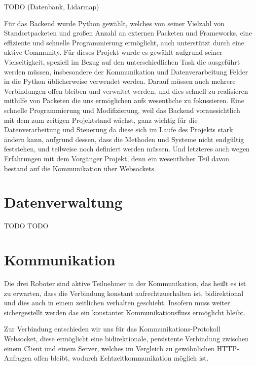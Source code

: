 TODO (Datenbank, Lidarmap)


Für das Backend wurde Python gewählt, 
welches von seiner Vielzahl von Standortpacketen und 
großen Anzahl an externen Packeten und Frameworks, 
eine effiziente und schnelle Programmierung ermöglicht, 
auch unterstützt durch eine aktive Community.
% 
Für dieses Projekt wurde es gewählt aufgrund seiner Vielseitigkeit, 
speziell im Bezug auf den unterschiedlichen Task die ausgeführt werden müssen, 
insbesondere der Kommunikation und Datenverarbeitung 
Felder in die Python üblicherweise verwendet werden.
% 
Darauf müssen auch mehrere Verbindungen offen bleiben und verwaltet werden,
und dies schnell zu realisieren mithilfe von Packeten 
die uns ermöglichen aufs wesentliche zu fokussieren.
% 
Eine schnelle Programmierung und Modifizierung, 
weil das Backend voraussichtlich mit dem zum zeitigen Projektstand wächst, 
ganz wichtig für die Datenverarbeitung und Steuerung da diese sich im Laufe des Projekts stark ändern kann,
aufgrund dessen, dass die Methoden und Systeme nicht endgültig feststehen, 
und teilweise noch definiert werden müssen.
% 
Und letzteres auch wegen Erfahrungen mit dem Vorgänger Projekt, 
denn ein wesentlicher Teil davon bestand auf die Kommunikation über Websockets.

\section{Datenverwaltung}
\label{subsec:backend_data}
TODO
TODO

\section{Kommunikation}
\label{subsec:Kommunikation}
Die drei Roboter sind aktive Teilnehmer in der Kommunikation, 
das heißt es ist zu erwarten, dass die Verbindung konstant aufrechtzuerhalten ist,
bidirektional und dies auch in einem zeitlichen verhalten geschieht. 
Insofern muss weiter sichergestellt werden das ein konstanter Kommunikationsfluss ermöglicht bleibt.

Zur Verbindung entschieden wir uns für das Kommunikations-Protokoll Websocket, 
diese ermöglicht eine bidirektionale, persistente Verbindung zwischen einem Client und einem Server,
welches im Vergleich zu gewöhnlichen HTTP-Anfragen offen bleibt, wodurch Echtzeitkommunikation möglich ist.

